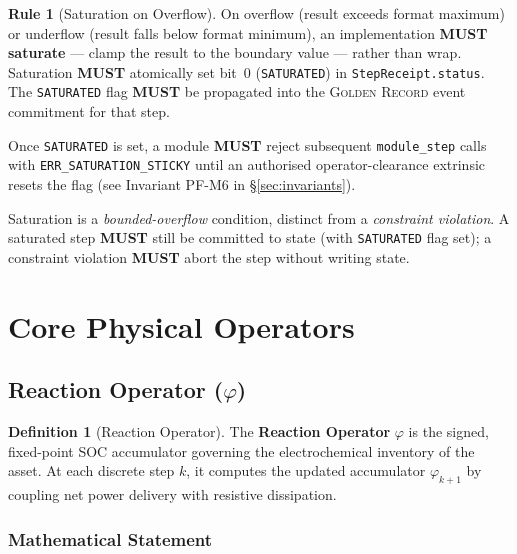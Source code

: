 \documentclass[11pt,letterpaper]{article}
\theoremstyle{definition}
\newtheorem{definition}{Definition}[section]
\newtheorem{specrule}{Rule}[section]
\newcommand{\GR}{\textsc{Golden Record}}
\newcommand{\MUST}{\textbf{MUST}}
\newcommand{\ph}{\varphi}       %
\begin{document}
\begin{specrule}[Saturation on Overflow]
\label{rule:saturation}
On overflow (result exceeds format maximum) or underflow (result falls below format minimum), an implementation \MUST{} \textbf{saturate} — clamp the result to the boundary value — rather than wrap. Saturation \MUST{} atomically set bit~0 (\texttt{SATURATED}) in \texttt{StepReceipt.status}. The \texttt{SATURATED} flag \MUST{} be propagated into the \GR{} event commitment for that step.

Once \texttt{SATURATED} is set, a module \MUST{} reject subsequent \texttt{module\_step} calls with \texttt{ERR\_SATURATION\_STICKY} until an authorised operator-clearance extrinsic resets the flag (see Invariant PF-M6 in §\ref{sec:invariants}).
\end{specrule}

\noindent Saturation is a \emph{bounded-overflow} condition, distinct from a \emph{constraint violation}. A saturated step \MUST{} still be committed to state (with \texttt{SATURATED} flag set); a constraint violation \MUST{} abort the step without writing state.

\section{Core Physical Operators}
\label{sec:operators}

\subsection{Reaction Operator ($\ph$)}
\label{sec:phi}

\begin{definition}[Reaction Operator]
\label{def:phi}
The \textbf{Reaction Operator} $\ph$ is the signed, fixed-point SOC accumulator governing the electrochemical inventory of the asset. At each discrete step $k$, it computes the updated accumulator $\ph_{k+1}$ by coupling net power delivery with resistive dissipation.
\end{definition}

\subsubsection{Mathematical Statement}
\end{document}
